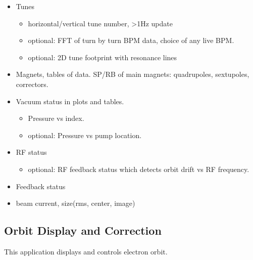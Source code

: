 \documentclass[letterpaper,showtrims]{memoir}
\begin{document}
\begin{itemize}
\item Tunes
      \begin{itemize}%
      \item horizontal/vertical tune number, >1Hz update
      \item optional: FFT of turn by turn BPM data, choice of any live BPM.
      \item optional: 2D tune footprint with resonance lines
      \end{itemize}
\item Magnets, tables of data. SP/RB of main magnets: quadrupoles, sextupoles, correctors.
\item Vacuum status in plots and tables.
      \begin{itemize}%
      \item Pressure vs index.
      \item optional: Pressure vs pump location.
      \end{itemize}
\item RF status
      \begin{itemize}%
      \item optional: RF feedback status which detects orbit drift vs RF frequency.
      \end{itemize}
\item Feedback status
\item beam current, size(rms, center, image)
\end{itemize}


\subsection{Orbit Display and Correction}

This application displays and controls electron orbit.
  
\end{document}
